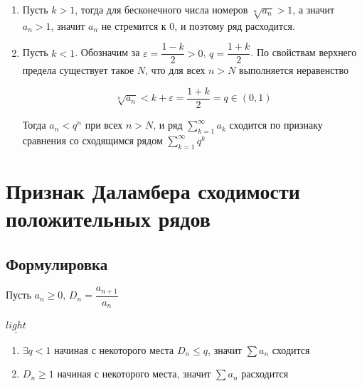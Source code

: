 \documentclass{article}
\begin{document}
            \begin{enumerate}
            
                \item Пусть $k > 1$, тогда для бесконечного числа номеров $\sqrt[n]{a_n} > 1$, а значит $a_n > 1$, значит $a_n$ не стремится к $0$, и поэтому ряд расходится.
                
                \item Пусть $k < 1$. Обозначим за $\varepsilon = \dfrac{1 - k}{2} > 0$, $q = \dfrac{1 + k}{2}$. По свойствам верхнего предела существует такое $N$, что для всех $n > N$ выполняется неравенство 
                
                    $$\sqrt[n]{a_n} < k + \varepsilon = \dfrac{1 + k}{2} = q \in (0, 1)$$
                    
                    Тогда $a_n < q^n$ при всех $n > N$, и ряд $\sum\limits^{\infty}_{k = 1} a_k$ сходится по признаку сравнения со сходящимся рядом $\sum\limits^{\infty}_{k = 1} q^k$
                
            \end{enumerate}
            
    \newpage
    
    \section{Признак Даламбера сходимости положительных рядов}
    
        \subsection{Формулировка}
        
            Пусть $a_n \geq 0$, $D_n = \dfrac{a_{n + 1}}{a_n}$
            
            $\underline{light}$
            
            \begin{enumerate}
            
                \item $\exists q < 1$ начиная с некоторого места $D_n \leq q$, значит $\sum a_n$ сходится
                
                \item $D_n \geq 1$ начиная с некоторого места, значит $\sum a_n$ расходится
                
            \end{enumerate}
            
\end{document}
